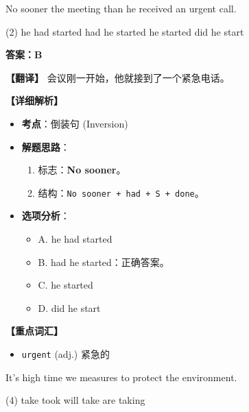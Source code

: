 \documentclass[11pt, a4paper]{article}
\newcommand{\analysis}[4]{
    \begin{solutionbox}
        \textbf{答案：#1}
        
        \textbf{【翻译】} #2
        
        \textbf{【详细解析】}
        #3
        
        \textbf{【重点词汇】}
        #4
    \end{solutionbox}
}
\newcommand{\blank}{\underline{\hspace{1.5cm}}}
\begin{document}
\begin{questions}
    \item No sooner \blank the meeting than he received an urgent call.
    \begin{tasks}(2)
        \task he had started \task had he started
        \task he started \task did he start
    \end{tasks}
    \analysis{B}{会议刚一开始，他就接到了一个紧急电话。}{
        \begin{itemize}
            \item \textbf{考点}：倒装句 (Inversion)
            \item \textbf{解题思路}：
                \begin{enumerate}
                    \item 标志：\textbf{No sooner}。
                    \item 结构：\texttt{No sooner + had + S + done}。
                \end{enumerate}
            \item \textbf{选项分析}：
                \begin{itemize}
                    \item A. he had started
                    \item B. had he started：正确答案。
                    \item C. he started
                    \item D. did he start
                \end{itemize}
        \end{itemize}
    }{
        \begin{itemize}
            \item \texttt{urgent} (adj.) 紧急的
        \end{itemize}
    }

    \item It's high time we \blank measures to protect the environment.
    \begin{tasks}(4)
        \task take \task took \task will take \task are taking
    \end{tasks}
\end{questions}

\end{document}
